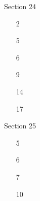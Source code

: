 







Section 24

 \begin{enumerate}

   \item[2] 
   \pagebreak
   \item[5] 
   \pagebreak
   \item[6] 
   \pagebreak
   \item[9] 
   \pagebreak
   \item[14] 
   \pagebreak
   \item[17] 
   \pagebreak

 \end{enumerate}

Section 25

 \begin{enumerate}

    \item[5] 
    \pagebreak
    \item[6] 
    \pagebreak
    \item[7] 
    \pagebreak
    \item[10] 
 
  \end{enumerate}


